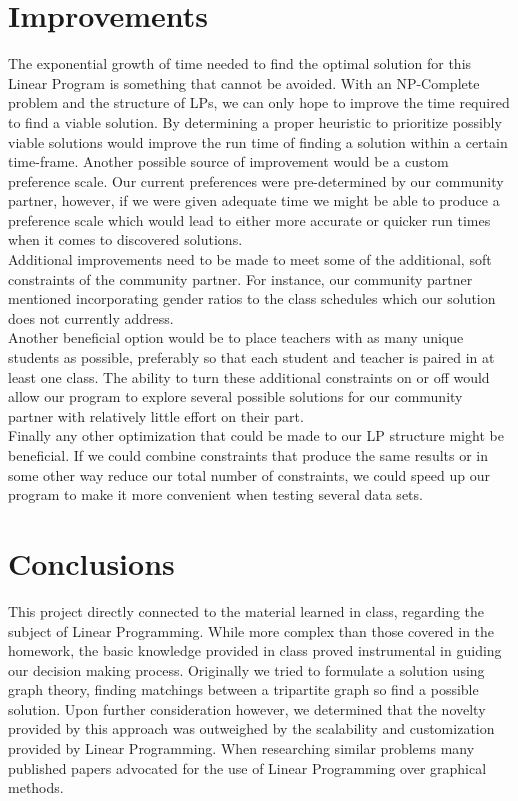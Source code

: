 \documentclass[11pt]{article}
\begin{document}
\section{Improvements}
The exponential growth of time needed to find the optimal solution for this Linear Program is something that cannot be avoided. With an NP-Complete problem and the structure of LPs, we can only hope to improve the time required to find a viable solution. By determining a proper heuristic to prioritize possibly viable solutions would improve the run time of finding a solution within a certain time-frame. Another possible source of improvement would be a custom preference scale. Our current preferences were pre-determined by our community partner, however, if we were given adequate time we might be able to produce a preference scale which would lead to either more accurate or quicker run times when it comes to discovered solutions.\\
\indent Additional improvements need to be made to meet some of the additional, soft constraints of the community partner. For instance, our community partner mentioned incorporating gender ratios to the class schedules which our solution does not currently address.\\
\indent Another beneficial option would be to place teachers with as many unique students as possible, preferably so that each student and teacher is paired in at least one class. The ability to turn these additional constraints on or off would allow our program to explore several possible solutions for our community partner with relatively little effort on their part.\\
\indent Finally any other optimization that could be made to our LP structure might be beneficial. If we could combine constraints that produce the same results or in some other way reduce our total number of constraints, we could speed up our program to make it more convenient when testing several data sets.

\section{Conclusions}
This project directly connected to the material learned in class, regarding the subject of Linear Programming. While more complex than those covered in the homework, the basic knowledge provided in class proved instrumental in guiding our decision making process. Originally we tried to formulate a solution using graph theory, finding matchings between a tripartite graph so find a possible solution. Upon further consideration however, we determined that the novelty provided by this approach was outweighed by the scalability and customization provided by Linear Programming. When researching similar problems many published papers advocated for the use of Linear Programming over graphical methods.
\end{document}
